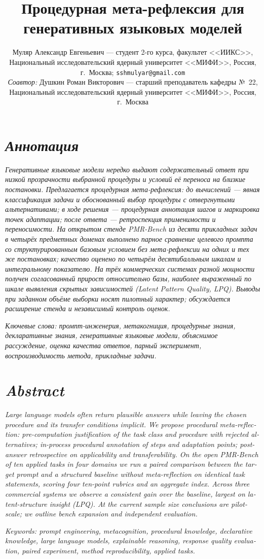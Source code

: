 \documentclass[a4paper,12pt]{article}
\title{Процедурная мета-рефлексия для генеративных языковых моделей}
\author{%
  Муляр Александр Евгеньевич --- студент 2-го курса, факультет <<ИИКС>>, Национальный исследовательский ядерный университет <<МИФИ>>, Россия, г.~Москва; \texttt{sshmulyar@gmail.com}\\[0.45em]
  \textit{Соавтор:} Душкин Роман Викторович --- старший преподаватель кафедры №~22, Национальный исследовательский ядерный университет <<МИФИ>>, Россия, г.~Москва
}
\date{}
\begin{document}
\maketitle
\thispagestyle{empty}

\section*{\textit{Аннотация}}
\textit{%
Генеративные языковые модели нередко выдают содержательный ответ при низкой прозрачности выбранной процедуры и условий её переноса на близкие постановки. Предлагается процедурная мета-рефлексия: до вычислений --- явная классификация задачи и обоснованный выбор процедуры с отвергнутыми альтернативами; в ходе решения --- процедурная аннотация шагов и маркировка точек адаптации; после ответа --- ретроспекция применимости и переносимости. На открытом стенде PMR-Bench из десяти прикладных задач в четырёх предметных доменах выполнено парное сравнение целевого промпта со структурированным базовым условием без мета-рефлексии на одних и тех же постановках; качество оценено по четырём десятибалльным шкалам и интегральному показателю. На трёх коммерческих системах разной мощности получен согласованный прирост относительно базы, наиболее выраженный по шкале выявления скрытых зависимостей (\textit{Latent Pattern Quality}, LPQ). Выводы при заданном объёме выборки носят пилотный характер; обсуждается расширение стенда и независимый контроль оценок.}

\medskip
\textit{Ключевые слова: промпт-инженерия, метакогниция, процедурные знания, декларативные знания, генеративные языковые модели, объяснимое рассуждение, оценка качества ответов, парный эксперимент, воспроизводимость метода, прикладные задачи.}

\medskip
\section*{\textit{Abstract}}
\begin{english}
\textit{%
Large language models often return plausible answers while leaving the chosen procedure and its transfer conditions implicit. We propose procedural meta-reflection: pre-computation justification of the task class and procedure with rejected alternatives; in-process procedural annotation of steps and adaptation points; post-answer retrospective on applicability and transferability. On the open PMR-Bench of ten applied tasks in four domains we run a paired comparison between the target prompt and a structured baseline without meta-reflection on identical task statements, scoring four ten-point rubrics and an aggregate index. Across three commercial systems we observe a consistent gain over the baseline, largest on latent-structure insight (LPQ). At the current sample size conclusions are pilot-scale; we outline bench expansion and independent evaluation.}

\medskip
\textit{Keywords: prompt engineering, metacognition, procedural knowledge, declarative knowledge, large language models, explainable reasoning, response quality evaluation, paired experiment, method reproducibility, applied tasks.}
\end{english}
\end{document}
